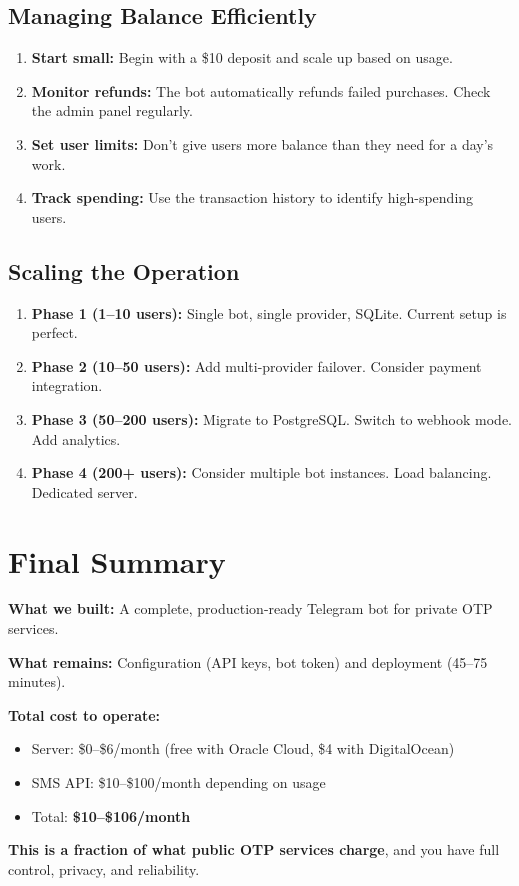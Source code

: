 \subsection{Managing Balance Efficiently}

\begin{enumerate}
    \item \textbf{Start small:} Begin with a \$10 deposit and scale up based on usage.
    \item \textbf{Monitor refunds:} The bot automatically refunds failed purchases. Check the admin panel regularly.
    \item \textbf{Set user limits:} Don't give users more balance than they need for a day's work.
    \item \textbf{Track spending:} Use the transaction history to identify high-spending users.
\end{enumerate}

\subsection{Scaling the Operation}

\begin{enumerate}
    \item \textbf{Phase 1 (1--10 users):} Single bot, single provider, SQLite. Current setup is perfect.
    \item \textbf{Phase 2 (10--50 users):} Add multi-provider failover. Consider payment integration.
    \item \textbf{Phase 3 (50--200 users):} Migrate to PostgreSQL. Switch to webhook mode. Add analytics.
    \item \textbf{Phase 4 (200+ users):} Consider multiple bot instances. Load balancing. Dedicated server.
\end{enumerate}

\section{Final Summary}

\begin{successbox}
\textbf{What we built:} A complete, production-ready Telegram bot for private OTP services.

\textbf{What remains:} Configuration (API keys, bot token) and deployment (45--75 minutes).

\textbf{Total cost to operate:}
\begin{itemize}
    \item Server: \$0--\$6/month (free with Oracle Cloud, \$4 with DigitalOcean)
    \item SMS API: \$10--\$100/month depending on usage
    \item Total: \textbf{\$10--\$106/month}
\end{itemize}

\textbf{This is a fraction of what public OTP services charge}, and you have full control, privacy, and reliability.
\end{successbox}

